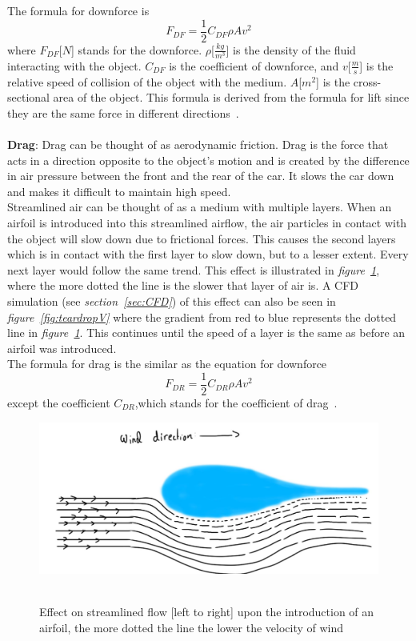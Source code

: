 \documentclass[11pt, a4paper]{article}
\begin{document}
The formula for downforce is
\begin{equation}   
F_{DF}=\frac{1}{2}C_{DF}\rho Av^2 
\end{equation} 
where $F_{DF}$[$N$] stands for the downforce. $\rho$[$\frac{kg}{m^3}$] is the density of the fluid interacting with the object. $C_{DF}$ is the coefficient of downforce,
and $v$[$\frac{m}{s}$] is the relative speed of collision of the object with the medium. $A$[$m^2$] is the cross-sectional area of the object. This formula is derived from the formula for lift since they are the same force in different directions~\cite{5}.
\\\\
\textbf{Drag}: Drag can be thought of as aerodynamic friction. Drag is the force that acts in a direction opposite to the object's motion and is created by the difference in air pressure between the front and the rear of the car.
It slows the car down and makes it difficult to maintain high speed.\\
Streamlined air can be thought of as a medium with multiple layers. When an airfoil is introduced into this streamlined airflow, the air particles in contact with the object will slow down due to frictional forces. 
This causes the second layers which is in contact with the first layer to slow down, but to a lesser extent. Every next layer would follow the same trend.
This effect is illustrated in \textit{figure~\ref{fig:dragIllustration}}, where the more dotted the line is the slower that layer of air is. A CFD simulation (see \textit{section~\ref{sec:CFD}}) of this effect can also be seen in \textit{figure~\ref{fig:teardropV}} where the gradient from red to blue represents the dotted line in \textit{figure~\ref{fig:dragIllustration}}.
This continues until the speed of a layer is the same as before an airfoil was introduced.\\

The formula for drag is the similar as the equation for downforce
\begin{equation}   
F_{DR}=\frac{1}{2}C_{DR}\rho Av^2 
\end{equation} 
except the coefficient $C_{DR}$,which stands for the coefficient of drag~\cite{3}.
\begin{figure}[H]
    \caption{Effect on streamlined flow [left to right] upon the introduction of an airfoil, the more dotted the line the lower the velocity of wind} 
    \centering 
    \includegraphics[width=\textwidth]{images/drag_effect_airfoil.jpg}
~\label{fig:dragIllustration}
\end{figure} 
\end{document}
